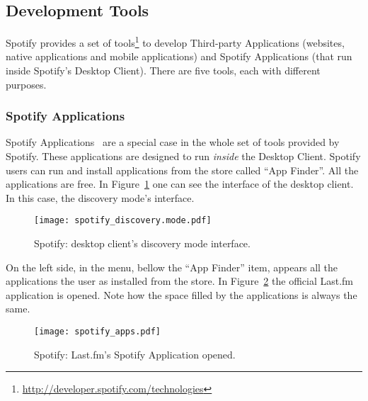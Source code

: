 



    \subsection{Development Tools} %
    \label{sec:devtools}
    
      Spotify provides a set of tools\footnote{\url{http://developer.spotify.com/technologies}} to develop Third-party Applications (websites, native applications and mobile applications) and Spotify Applications (that run inside Spotify's Desktop Client).
      There are five tools, each with different purposes.

      \subsubsection{Spotify Applications} %
      \label{sub:spotify_apps}
        Spotify Applications~\cite{spotifyapps} are a special case in the whole set of tools provided by Spotify.
        These applications are designed to run \emph{inside} the Desktop Client.
        Spotify users can run and install applications from the store called ``App Finder''.
        All the applications are free.
        In Figure~\ref{fig:spotify_apps} one can see the interface of the desktop client.
        In this case, the discovery mode's interface.
        \begin{figure}
          \begin{center}
            \texttt{[image: spotify\_discovery.mode.pdf]}
          \end{center}
          \caption{Spotify: desktop client's discovery mode interface.}
          \label{fig:spotify_apps}
        \end{figure}
        On the left side, in the menu, bellow the ``App Finder'' item, appears all the applications the user as installed from the store.
        In Figure~\ref{fig:spotify_apps2} the official Last.fm application is opened.
        Note how the space filled by the applications is always the same.

        \begin{figure}
          \begin{center}
            \texttt{[image: spotify\_apps.pdf]}
          \end{center}
          \caption{Spotify: Last.fm's Spotify Application opened.}
          \label{fig:spotify_apps2}
        \end{figure}

